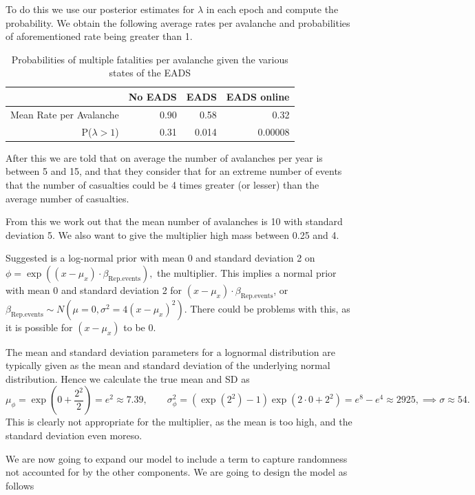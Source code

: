 \documentclass[12pt]{extarticle}
\begin{document}
To do this we use our posterior estimates for $\lambda$ in each epoch and compute the probability. We obtain the following average rates per avalanche and probabilities of aforementioned rate being greater than 1.

\begin{table}[ht]
	\centering
\begin{tabular}{r|rrr}
	\hline
	& No EADS & EADS & EADS online \\
	\hline
	Mean Rate per Avalanche& 0.90 & 0.58 & 0.32 \\
	P($\lambda > 1$) & 0.31 & 0.014 & 0.00008\\
	\hline
\end{tabular}
\caption{Probabilities of multiple fatalities per avalanche given the various states of the EADS}
\label{tab:probmdpa}
\end{table}

After this we are told that on average the number of avalanches per year is between 5 and 15, and that they consider that for an extreme number of events that the number of casualties could be 4 times greater (or lesser) than the average number of casualties. 

From this we work out that the mean number of avalanches is 10 with standard deviation 5. We also want to give the multiplier high mass between 0.25 and 4. 

Suggested is a log-normal prior with mean 0 and standard deviation 2 on $\phi = \exp((x-\mu_x)\cdot\beta_{\mathrm{Rep.events}}),$ the multiplier. This implies a normal prior with mean 0 and standard deviation 2 for $(x-\mu_x)\cdot\beta_{\mathrm{Rep.events}}$, or $\beta_{\mathrm{Rep.events}} \sim N(\mu = 0, \sigma^2 = 4(x-\mu_x)^2).$ There could be problems with this, as it is possible for $(x-\mu_x)$ to be 0. 

The mean and standard deviation parameters for a lognormal distribution are typically given as the mean and standard deviation of the underlying normal distribution. Hence we calculate the true mean and SD as \[\mu_{\phi} = \exp\left(0 + \frac{2^2}{2}\right) = e^2 \approx 7.39, \qquad \sigma^2_{\phi} = (\exp(2^2)-1)\exp(2\cdot0 + 2^2) = e^8 - e^4 \approx 2925, \implies \sigma \approx 54.\] This is clearly not appropriate for the multiplier, as the mean is too high, and the standard deviation even moreso.

We are now going to expand our model to include a term to capture randomness not accounted for by the other components. We are going to design the model as follows
\end{document}
